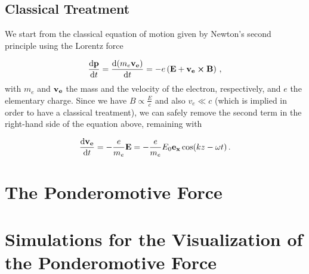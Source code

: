 \documentclass[12pt, class=report, crop=false]{standalone}
\begin{document}
\subsection{Classical Treatment}

We start from the classical equation of motion given by Newton's second principle using the Lorentz force

\begin{equation}
  \dv{\vb{p}}{t} = \dv{(m_e \vb{v_e})}{t} = - e \left( \vb{E} + \vb{v_e}\cp\vb{B} \right)\,,
\end{equation}
with \(m_e\) and \(\vb{v_e}\) the mass and the velocity of the electron, respectively, and \(e\) the elementary charge. Since we have \(B\propto\frac{E}{c}\) and also \(v_e \ll c\) (which is implied in order to have a classical treatment), we can safely remove the second term in the right-hand side of the equation above, remaining with

\begin{equation}
  \dv{\vb{v_e}}{t} = - \frac{e}{m_e} \vb{E} = - \frac{e}{m_e}  E_0 \vb{e_x} \cos(kz-\omega t)\,.
\end{equation}


\section{The Ponderomotive Force}
\section{Simulations for the Visualization of the Ponderomotive Force}
\end{document}
